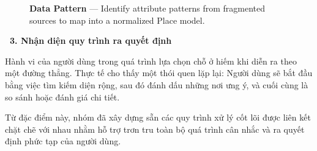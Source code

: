 \documentclass[12pt, a4paper]{article}
\begin{document}
\begin{figure}[H]
    \centering
    \caption{\textbf{Data Pattern} --- Identify attribute patterns from fragmented sources to map into a normalized Place model.}
\end{figure}

\vspace{0.4cm}
\noindent\textcolor{orange!80!black}{\textbf{\faBalanceScale \ 3. Nhận diện quy trình ra quyết định}}
\vspace{0.15cm}

\begin{tcolorbox}[blanker, borderline west={3pt}{0pt}{orange!70!black}, left=12pt, top=2pt, bottom=2pt]
Hành vi của người dùng trong quá trình lựa chọn chỗ ở hiếm khi diễn ra theo một đường thẳng. Thực tế cho thấy một thói quen lặp lại: Người dùng sẽ bắt đầu bằng việc tìm kiếm diện rộng, sau đó đánh dấu những nơi ưng ý, và cuối cùng là so sánh hoặc đánh giá chi tiết.

\vspace{0.15cm}
\noindent Từ đặc điểm này, nhóm đã xây dựng sẵn các quy trình xử lý cốt lõi được liên kết chặt chẽ với nhau nhằm hỗ trợ trơn tru toàn bộ quá trình cân nhắc và ra quyết định phức tạp của người dùng.
\end{tcolorbox}
\end{document}
